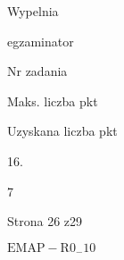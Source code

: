 \documentclass[a4paper,12pt]{article}
\begin{document}
Wypelnia

egzaminator

Nr zadania

Maks. liczba pkt

Uzyskana liczba pkt

16.

7

Strona 26 z29

$\mathrm{E}\mathrm{M}\mathrm{A}\mathrm{P}-\mathrm{R}0_{-}10$
\end{document}
